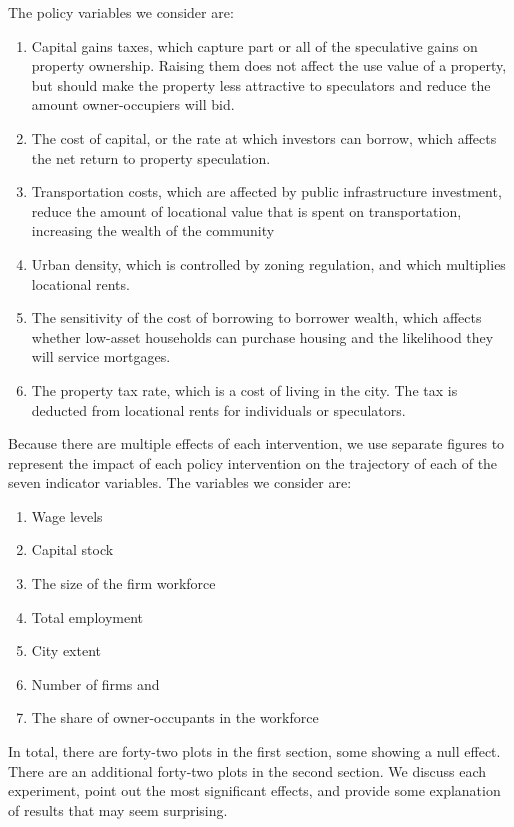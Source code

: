 The policy variables we consider are: 
\begin{enumerate}
\item Capital gains taxes, which capture part or all of the speculative gains on property ownership. Raising them does not affect the use value of a property, but should make the property less attractive to speculators and reduce the amount owner-occupiers will bid. 
\item The cost of capital, or the rate at which investors can borrow, which affects the net return to property speculation.
\item Transportation costs, which are affected by public infrastructure investment, reduce the amount of locational value that is spent on transportation, increasing the wealth of the community 
\item Urban density, which is controlled by zoning regulation, and which multiplies locational rents. 
\item The sensitivity of the cost of borrowing to borrower wealth, which affects whether low-asset households can purchase housing and the likelihood they will service mortgages.
\item The property tax rate, which is a cost of living in the city. The tax is deducted from locational rents for individuals or speculators.
\end{enumerate}
Because there are multiple effects of each intervention, we use separate figures to represent the impact of each policy intervention on the trajectory of each of the seven indicator variables. %
The variables we consider are:
\begin{enumerate}
    \item Wage levels
    \item Capital stock
    \item The size of the firm workforce
    \item Total employment
    \item City extent
    \item Number of firms and 
    \item The share of owner-occupants in the workforce
\end{enumerate} 
In total, there are forty-two plots in the first section, some showing a null effect. There are an additional forty-two plots in the second section. We discuss each experiment, point out the most significant effects, and provide some explanation of results that may seem surprising.  


